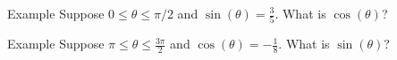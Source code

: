 \documentclass[presentation]{beamer}
\begin{document}
\begin{frame}[label={sec:orgf1591d8}]{Example}
Suppose \(0 \le \theta \le \pi/2\) and \(\sin(\theta) = \frac{3}{5}\).  What is
\(\cos(\theta)\)?

\vspace{10in}
\end{frame}

\begin{frame}[label={sec:orgbaa423e}]{Example}
Suppose \(\pi \le \theta \le \frac{3\pi}{2}\) and \(\cos(\theta) = -\frac{1}{8}.\) What is
\(\sin(\theta)\)?

\vspace{10in}
\end{frame}
\end{document}
